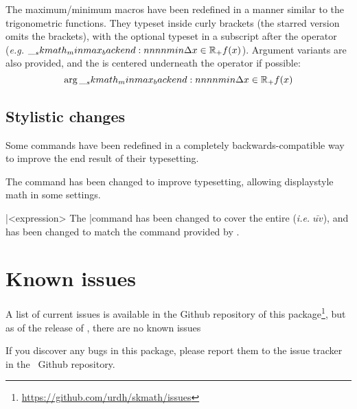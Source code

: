 \documentclass[commonsets,load]{skdoc}
\begin{document}
  \DescribeMacro{}
  \DescribeMacro{}
  \DescribeMacro{}
  \DescribeMacro{}
  \DescribeMacro{}
  \DescribeMacro{}
  The maximum/minimum macros have been redefined in a manner similar to
  the trigonometric functions. They typeset  inside
  curly brackets (the starred version omits the brackets), with the
  optional  typeset in a subscript after the operator
  (\emph{e.g.} \(\min*[x\in\R_{+}]{f(x)}\)). Argument variants are also
  provided, and the  is centered underneath the operator
  if possible:
  \begin{equation*}
    \argmin*[x\in\R_{+}]{f(x)}
  \end{equation*}

  \subsection{Stylistic changes}
  Some commands have been redefined in a completely backwards-compatible
  way to improve the end result of their typesetting.
 
  \DescribeMacro{}
  The \Macro\frac command has been changed to improve typesetting,
  allowing displaystyle math in some settings.
 
  \DescribeMacro\bar{<expression>}
  \DescribeMacro{}
  The \Macro\bar command has been changed to cover the entire 
   (\emph{i.e.} \(\bar{uv}\)), and \Macro\vec has
  been changed to match the  command provided by 
  .

  \section{Known issues}
  A list of current issues is available in the Github repository of this
  package\footnote{\url{https://github.com/urdh/skmath/issues}}, but as
  of the release of \theversion, there are no known issues

  If you discover any bugs in this package, please report them to the issue
  tracker in the \thepackage\ Github repository.

  \Implementation\ExplHack
\end{document}
